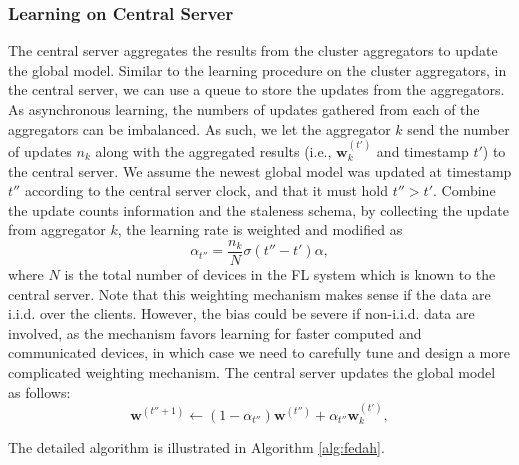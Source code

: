 \documentclass[10pt,twocolumn,letterpaper]{article}
\theoremstyle{definition}
\begin{document}
\subsubsection{Learning on Central Server}
The central server aggregates the results from the cluster aggregators to update the global model. Similar to the learning procedure on the cluster aggregators, in the central server, we can use a queue to store the updates from the aggregators. As asynchronous learning, the numbers of updates gathered from each of the aggregators can be imbalanced. As such, we let the aggregator $k$ send the number of updates $n_k$ along with the aggregated results (i.e., $\mathbf{w}_k^{(t')}$ and timestamp $t'$) to the central server. We assume the newest global model was updated at timestamp $t''$ according to the central server clock, and that it must hold $t'' > t'$. Combine the update counts information and the staleness schema, by collecting the update from aggregator $k$, the learning rate is weighted and modified as $$\alpha_{t''} = \dfrac{n_k}{N} \sigma(t''-t') \alpha, $$
where $N$ is the total number of devices in the FL system which is known to the central server. 
Note that this weighting mechanism makes sense if the data are i.i.d. over the clients. However, the bias could be severe if non-i.i.d. data are involved, as the mechanism favors learning for faster computed and communicated devices, in which case we need to carefully tune and design a more complicated weighting mechanism. The central server updates the global model as follows:
\[
    \mathbf{w}^{(t''+1)}  \leftarrow (1-\alpha_{t''}) \mathbf{w}^{(t'')} + \alpha_{t''} \mathbf{w}^{(t')}_{k},
\]

The detailed algorithm is illustrated in Algorithm \ref{alg:fedah}.
\end{document}
